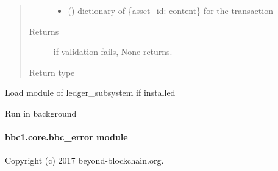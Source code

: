 \documentclass[letterpaper,10pt,english]{sphinxmanual}
\begin{document}
\begin{fulllineitems}
\begin{fulllineitems}
\begin{quote}
\begin{description}
\begin{itemize}
\item {} 
 () \textendash{} dictionary of \{asset\_id: content\} for the transaction

\end{itemize}

\item[{Returns}] \leavevmode
if validation fails, None returns.

\item[{Return type}] \leavevmode
{\hyperref[\detokenize{bbc1.core.bbclib:bbc1.core.bbclib.BBcTransaction}]{}}

\end{description}\end{quote}

\end{fulllineitems}


\end{fulllineitems}


\begin{fulllineitems}
\label{\detokenize{bbc1.core.bbc_core:bbc1.core.bbc_core.activate_ledgersubsystem}}
Load module of ledger\_subsystem if installed

\end{fulllineitems}


\begin{fulllineitems}
\label{\detokenize{bbc1.core.bbc_core:bbc1.core.bbc_core.daemonize}}
Run in background

\end{fulllineitems}



\paragraph{bbc1.core.bbc\_error module}
\label{\detokenize{bbc1.core.bbc_error:module-bbc1.core.bbc_error}}\label{\detokenize{bbc1.core.bbc_error::doc}}\label{\detokenize{bbc1.core.bbc_error:bbc1-core-bbc-error-module}}
Copyright (c) 2017 beyond-blockchain.org.
\end{document}
